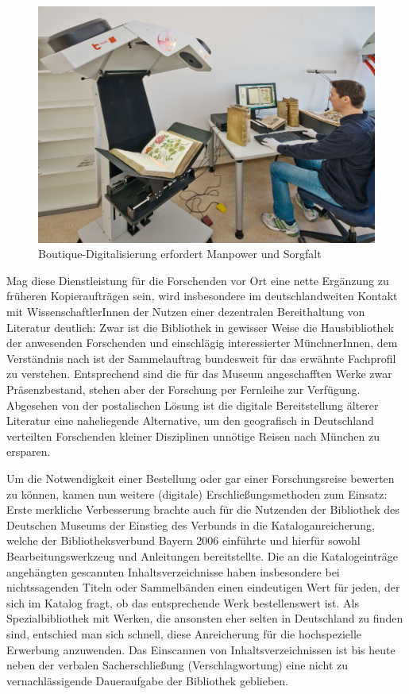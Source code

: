 \documentclass[a4paper,
fontsize=11pt,
oneside,
numbers=noperiodatend,
parskip=half-,
bibliography=totoc,
final
]{scrartcl}
\begin{document}
\begin{figure}
\centering
\includegraphics[width=.70\textwidth]{img/Abb3.jpg}
\caption{Boutique-Digitalisierung erfordert Manpower und Sorgfalt}
\end{figure}

Mag diese Dienstleistung für die Forschenden vor Ort eine nette
Ergänzung zu früheren Kopieraufträgen sein, wird insbesondere im
deutschlandweiten Kontakt mit WissenschaftlerInnen der Nutzen einer
dezentralen Bereithaltung von Literatur deutlich: Zwar ist die
Bibliothek in gewisser Weise die Hausbibliothek der anwesenden
Forschenden und einschlägig interessierter MünchnerInnen, dem
Verständnis nach ist der Sammelauftrag bundesweit für das erwähnte
Fachprofil zu verstehen. Entsprechend sind die für das Museum
angeschafften Werke zwar Präsenzbestand, stehen aber der Forschung per
Fernleihe zur Verfügung. Abgesehen von der postalischen Lösung ist die
digitale Bereitstellung älterer Literatur eine naheliegende Alternative,
um den geografisch in Deutschland verteilten Forschenden kleiner
Disziplinen unnötige Reisen nach München zu ersparen.

Um die Notwendigkeit einer Bestellung oder gar einer Forschungsreise
bewerten zu können, kamen nun weitere (digitale) Erschließungsmethoden
zum Einsatz: Erste merkliche Verbesserung brachte auch für die Nutzenden
der Bibliothek des Deutschen Museums der Einstieg des Verbunds in die
Kataloganreicherung, welche der Bibliotheksverbund Bayern 2006 einführte
und hierfür sowohl Bearbeitungswerkzeug und Anleitungen bereitstellte.
Die an die Katalogeinträge angehängten gescannten Inhaltsverzeichnisse
haben insbesondere bei nichtssagenden Titeln oder Sammelbänden einen
eindeutigen Wert für jeden, der sich im Katalog fragt, ob das
entsprechende Werk bestellenswert ist. Als Spezialbibliothek mit Werken,
die ansonsten eher selten in Deutschland zu finden sind, entschied man
sich schnell, diese Anreicherung für die hochspezielle Erwerbung
anzuwenden. Das Einscannen von Inhaltsverzeichnissen ist bis heute neben
der verbalen Sacherschließung (Verschlagwortung) eine nicht zu
vernachlässigende Daueraufgabe der Bibliothek geblieben.
\end{document}
